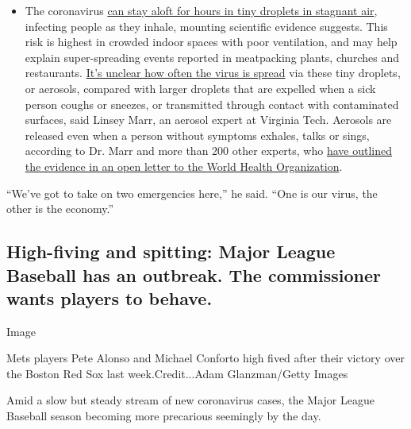\begin{itemize}
  \begin{itemize}
  \tightlist
  \item
    The coronavirus
    \href{https://www.nytimes.com/2020/07/04/health/239-experts-with-one-big-claim-the-coronavirus-is-airborne.html?action=click\&pgtype=Article\&state=default\&region=MAIN_CONTENT_3\&context=storylines_faq}{can
    stay aloft for hours in tiny droplets in stagnant air}, infecting
    people as they inhale, mounting scientific evidence suggests. This
    risk is highest in crowded indoor spaces with poor ventilation, and
    may help explain super-spreading events reported in meatpacking
    plants, churches and restaurants.
    \href{https://www.nytimes.com/2020/07/06/health/coronavirus-airborne-aerosols.html?action=click\&pgtype=Article\&state=default\&region=MAIN_CONTENT_3\&context=storylines_faq}{It's
    unclear how often the virus is spread} via these tiny droplets, or
    aerosols, compared with larger droplets that are expelled when a
    sick person coughs or sneezes, or transmitted through contact with
    contaminated surfaces, said Linsey Marr, an aerosol expert at
    Virginia Tech. Aerosols are released even when a person without
    symptoms exhales, talks or sings, according to Dr. Marr and more
    than 200 other experts, who
    \href{https://academic.oup.com/cid/article/doi/10.1093/cid/ciaa939/5867798}{have
    outlined the evidence in an open letter to the World Health
    Organization}.
  \end{itemize}
\end{itemize}

``We've got to take on two emergencies here,'' he said. ``One is our
virus, the other is the economy.''

\hypertarget{high-fiving-and-spitting-major-league-baseball-has-an-outbreak-the-commissioner-wants-players-to-behave}{%
\subsection{High-fiving and spitting: Major League Baseball has an
outbreak. The commissioner wants players to
behave.}\label{high-fiving-and-spitting-major-league-baseball-has-an-outbreak-the-commissioner-wants-players-to-behave}}

Image

Mets players Pete Alonso and Michael Conforto high fived after their
victory over the Boston Red Sox last week.Credit...Adam Glanzman/Getty
Images

Amid a slow but steady stream of new coronavirus cases, the Major League
Baseball season becoming more precarious seemingly by the day.

